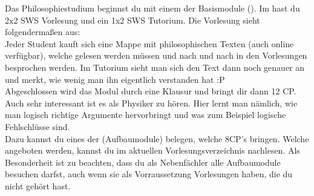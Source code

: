 Das Philosophiestudium beginnst du mit einem der Basismodule ().
Im  hast du 2x2 SWS Vorlesung und ein 1x2 SWS Tutorium.
Die Vorlesung sieht folgendermaßen aus:\\
Jeder Student kauft sich eine Mappe mit philosophischen Texten (auch online verf\"ugbar), welche gelesen werden m\"ussen und nach und nach in den Vorlesungen besprochen werden.
Im Tutorium sieht man sich den Text dann noch genauer an und merkt, wie wenig man ihn eigentlich verstanden hat :P\\
Abgeschlossen wird das Modul durch eine Klausur und bringt dir dann 12 CP.\\
Auch sehr interessant ist es als Physiker  zu h\"oren. 
Hier lernt man n\"amlich, wie man logisch richtige Argumente hervorbringt und was zum Beispiel logische Fehlschl\"usse sind. \\
Dazu kannst du eines der  (Aufbaumodule) belegen, welche 8CP's bringen.
Welche  angeboten werden, kannst du im aktuellen Vorlesungsverzeichnis nachlesen.
Als Besonderheit ist zu beachten, dass du als Nebenf\"achler alle Aufbaumodule besuchen darfst,
auch wenn sie als Vorraussetzung Vorlesungen haben, die du nicht geh\"ort hast.
